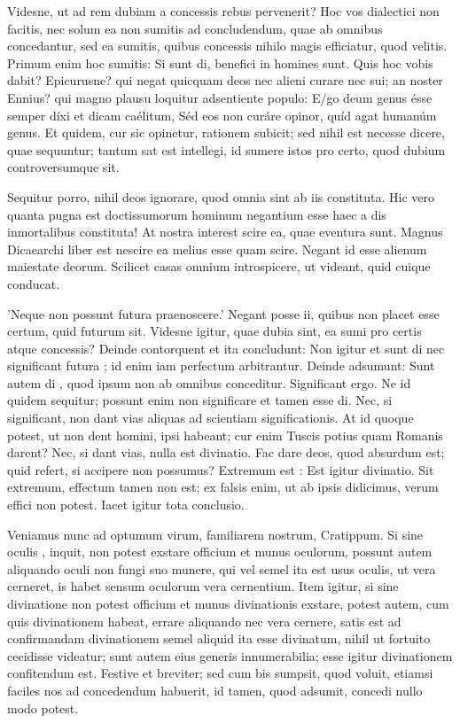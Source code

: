  Videsne, ut ad rem dubiam a concessis rebus pervenerit? Hoc vos dialectici non facitis, nec solum ea non sumitis ad concludendum, quae ab omnibus concedantur, sed ea sumitis, quibus concessis nihilo magis efficiatur, quod velitis. Primum enim hoc sumitis: Si sunt di, benefici in homines sunt. Quis hoc vobis dabit? Epicurusne? qui negat quicquam deos nec alieni curare nec sui; an noster Ennius? qui magno plausu loquitur adsentiente populo: E/go deum genus ésse semper díxi et dicam caélitum, Séd eos non curáre opinor, quíd agat humanúm genus. Et quidem, cur sic opinetur, rationem subicit; sed nihil est necesse dicere, quae sequuntur; tantum sat est intellegi, id sumere istos pro certo, quod dubium controversumque sit.

 Sequitur porro, nihil deos ignorare, quod omnia sint ab iis constituta. Hic vero quanta pugna est doctissumorum hominum negantium esse haec a dis inmortalibus constituta! At nostra interest scire ea, quae eventura sunt. Magnus Dicaearchi liber est nescire ea melius esse quam scire. Negant id esse alienum maiestate deorum. Scilicet casas omnium introspicere, ut videant, quid cuique conducat.

 'Neque non possunt futura praenoscere.' Negant posse ii, quibus non placet esse certum, quid futurum sit. Videsne igitur, quae dubia sint, ea sumi pro certis atque concessis? Deinde contorquent et ita concludunt: Non igitur et sunt di nec significant futura ; id enim iam perfectum arbitrantur. Deinde adsumunt: Sunt autem di , quod ipsum non ab omnibus conceditur. Significant ergo. Ne id quidem sequitur; possunt enim non significare et tamen esse di. Nec, si significant, non dant vias aliquas ad scientiam significationis. At id quoque potest, ut non dent homini, ipsi habeant; cur enim Tuscis potius quam Romanis darent? Nec, si dant vias, nulla est divinatio. Fac dare deos, quod absurdum est; quid refert, si accipere non possumus? Extremum est : Est igitur divinatio. Sit extremum, effectum tamen non est; ex falsis enim, ut ab ipsis didicimus, verum effici non potest. Iacet igitur tota conclusio.

 Veniamus nunc ad optumum virum, familiarem nostrum, Cratippum. Si sine oculis , inquit, non potest exstare officium et munus oculorum, possunt autem aliquando oculi non fungi suo munere, qui vel semel ita est usus oculis, ut vera cerneret, is habet sensum oculorum vera cernentium. Item igitur, si sine divinatione non potest officium et munus divinationis exstare, potest autem, cum quis divinationem habeat, errare aliquando nec vera cernere, satis est ad confirmandam divinationem semel aliquid ita esse divinatum, nihil ut fortuito cecidisse videatur; sunt autem eius generis innumerabilia; esse igitur divinationem confitendum est. Festive et breviter; sed cum bis sumpsit, quod voluit, etiamsi faciles nos ad concedendum habuerit, id tamen, quod adsumit, concedi nullo modo potest.

